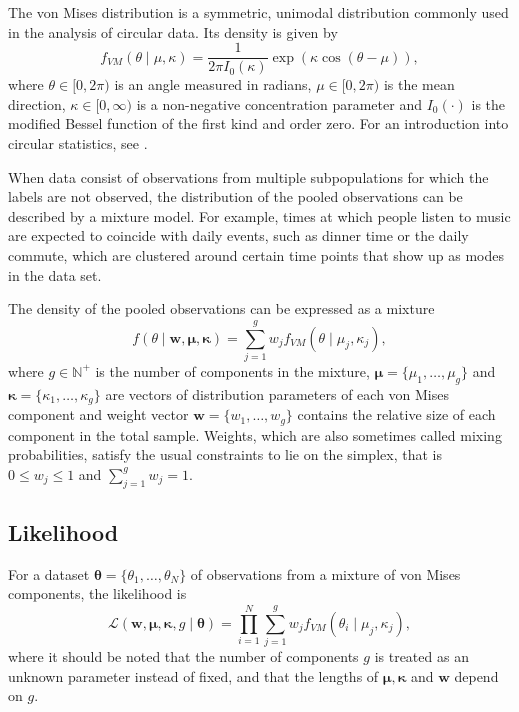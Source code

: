 The von Mises distribution is a symmetric, unimodal distribution commonly used in the analysis of circular data. Its density is given by
\begin{equation}
f_{VM}(\theta\mid\mu,\kappa) = \frac{1}{2\pi I_0(\kappa)} \exp({\kappa\cos(\theta-\mu)}),
\end{equation}
where $\theta \in \mathopen[ 0, 2\pi \mathclose)$ is an angle measured in radians, $\mu \in \mathopen[ 0, 2\pi \mathclose)$ is the mean direction, $\kappa \in \mathopen[ 0, \infty \mathclose)$ is a non-negative concentration parameter and $I_0(\cdot)$ is the modified Bessel function of the first kind and order zero. For an introduction into circular statistics, see \citep{Mardia2009}.

When data consist of observations from multiple subpopulations for which the labels are not observed, the distribution of the pooled observations can be described by a mixture model. For example, times at which people listen to music are expected to coincide with daily events, such as dinner time or the daily commute, which are clustered around certain time points that show up as modes in the data set. 

The density of the pooled observations can be expressed as a mixture
\begin{equation}
f(\theta\mid\bm{w},\bm{\mu},\bm{\kappa}) = \sum_{j=1}^{g} w_j f_{VM}(\theta\mid\mu_j,\kappa_j),
\end{equation}
where $g \in \mathbb{N}^+$ is the number of components in the mixture, $\bm{\mu}=\{\mu_1,\dotsc,\mu_g\}$ and $\bm{\kappa}=\{\kappa_1,\dotsc,\kappa_g\}$ are vectors of distribution parameters of each von Mises component and weight vector $\bm{w}=\{w_1,\dotsc,w_g\}$ contains the relative size of each component in the total sample. Weights, which are also sometimes called mixing probabilities, satisfy the usual constraints to lie on the simplex, that is $0 \leq w_j \leq 1$ and $\sum^{g}_{j=1}w_j=1$. 


\subsection{Likelihood}


For a dataset $\bm\theta = \{\theta_1,\dotsc,\theta_N\}$ of observations from a mixture of von Mises components, the likelihood is 
\begin{equation} \label{mixlik}
\mathcal{L}(\bm{w}, \bm\mu, \bm\kappa, g \mid \bm\theta) = \prod_{i=1}^N \sum_{j=1}^g w_j f_{VM}(\theta_i\mid\mu_{j},\kappa_{j}),
\end{equation}
where it should be noted that the number of components $g$ is treated as an unknown parameter instead of fixed, and that the lengths of $\bm\mu, \bm\kappa$ and $\bm{w}$ depend on $g$. 

